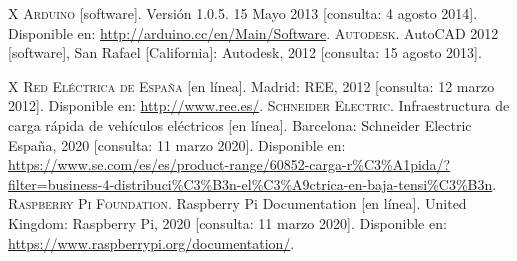 \documentclass[10pt,a4paper]{article}
\begin{document}
\renewcommand\bibname{Programas de cálculo}

\begin{thebibliography}{X}%
\setcounter{enumiv}{\value{contador}}
 \textsc{Arduino} [software]. Versión 1.0.5. 15 Mayo 2013 [consulta: 4 agosto 2014]. 
Disponible en: \url{http://arduino.cc/en/Main/Software}.
 \textsc{Autodesk}. AutoCAD 2012 [software], San Rafael [California]: Autodesk, 2012 [consulta: 15 agosto 2013].
\setcounter{contador}{\value{enumiv}}
\end{thebibliography}


\renewcommand\bibname{Otras referencias}

\begin{thebibliography}{X}%
\setcounter{enumiv}{\value{contador}}
 \textsc{Red Eléctrica de España} [en línea]. Madrid: REE, 2012 [consulta: 12 marzo 2012]. Disponible en: \url{http://www.ree.es/}.
\textsc{Schneider Electric}. Infraestructura de carga rápida de vehículos eléctricos [en línea]. Barcelona: Schneider Electric España, 2020 [consulta: 11 marzo 2020]. Disponible en: 
\url{https://www.se.com/es/es/product-range/60852-carga-r\%C3\%A1pida/?filter=business-4-distribuci\%C3\%B3n-el\%C3\%A9ctrica-en-baja-tensi\%C3\%B3n}.
\textsc{Raspberry Pi Foundation}. Raspberry Pi Documentation [en línea].  United Kingdom: Raspberry Pi, 2020 [consulta: 11 marzo 2020]. Disponible en: \url{https://www.raspberrypi.org/documentation/}.

\end{thebibliography}
\end{document}

